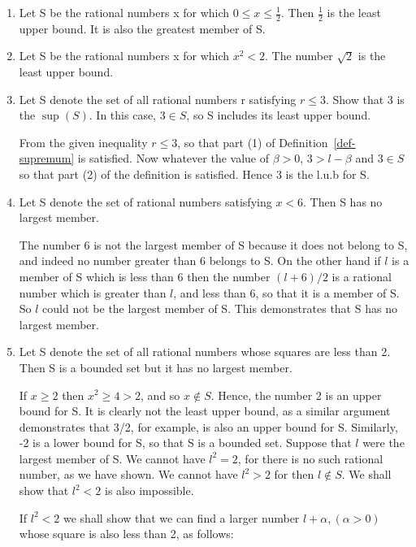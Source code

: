 \message{ !name(RealAnalysis.tex)}\documentclass[12pt]{scrbook}
\begin{document}
\begin{enumerate}
	\item Let S be the rational numbers x for which $0 \leq x \leq \frac{1}{2}$. Then $\frac{1}{2}$ is the least upper bound.  It is also the greatest member of S.
	
	\item Let S be the rational numbers x for which $x^2 < 2$.  The number $\sqrt{2}$ is the least upper bound.
	
	\item Let S denote the set of all rational numbers r satisfying $r \leq 3$.  Show that 3 is the $\sup(S)$.  In this case, $3 \in S$, so S includes its least upper bound. 
	
	From the given inequality $r \leq 3$, so that part (1) of Definition~\ref{def-supremum} is satisfied.  Now whatever the value of $\beta >0$, $3 > l - \beta$ and $3 \in S$ so that part (2) of the definition is satisfied.  Hence 3 is the l.u.b for S.
	
	\item Let S denote the set of rational numbers satisfying $x < 6$.  Then S has no largest member.
	
	The number 6 is not the largest member of S because it does not belong to S, and indeed no number greater than 6 belongs to S. On the other hand if $l$ is a member of S which is less than 6 then the number $(l + 6)/2$ is a rational number which is greater than $l$, and less than 6, so that it is a member of S.  So $l$ could not be the largest member of S. This demonstrates that S has no largest member.
	
	\item Let S denote the set of all rational numbers whose squares are less than 2.  Then S is a bounded set but it has no largest member.
	
	If $x \ge 2$ then $x^2 \ge 4 > 2$, and so $x \notin S$.  Hence, the number 2 is an upper bound for S.  It is clearly not the least upper bound, as a similar argument demonstrates that 3/2, for example, is also an upper bound for S.  Similarly, -2 is a lower bound for S, so that S is a bounded set.  Suppose that $l$ were the largest member of S.  We cannot have $l^2 = 2$, for there is no such rational number, as we have shown.  We cannot have $l^2 > 2$ for then $l \notin S$.  We shall show that $l^2 < 2$ is also impossible.
	
	If $l^2 < 2$ we shall show that we can find a larger number $l + \alpha, (\alpha > 0)$ whose square is also less than 2, as follows:
	

\end{enumerate}
\end{document}
